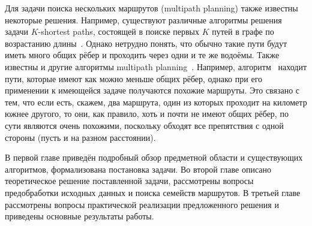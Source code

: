 Для задачи поиска нескольких маршрутов (multipath planning) также
известны некоторые решения. Например, существуют различные алгоритмы
решения задачи $K$-shortest paths, состоящей в поиске первых $K$ путей
в графе по возрастанию длины~\cite{eppstein1998finding,
yen1971finding}. Однако нетрудно понять, что обычно такие пути будут
иметь много общих рёбер и проходить через одни и те же водоёмы. Также
известны и другие алгоритмы multipath planning~\cite{lim2005shortest,
dial1971probabilistic, mafast}. Например,
алгоритм~\cite{lim2005shortest} находит пути, которые имеют как можно
меньше общих рёбер, однако при его применении к имеющейся задаче
получаются похожие маршруты. Это связано с тем, что если есть, скажем,
два маршрута, один из которых проходит на километр южнее другого, то
они, как правило, хоть и почти не имеют общих рёбер, по сути являются
очень похожими, поскольку обходят все препятствия с одной стороны
(пусть и на разном расстоянии).

В первой главе приведён подробный обзор предметной области и
существующих алгоритмов, формализована постановка задачи. Во второй
главе описано теоретическое решение поставленной задачи, рассмотрены
вопросы предобработки исходных данных и поиска семейств маршрутов. В
третьей главе рассмотрены вопросы практической реализации
предложенного решения и приведены основные результаты работы.

\FloatBarrier


